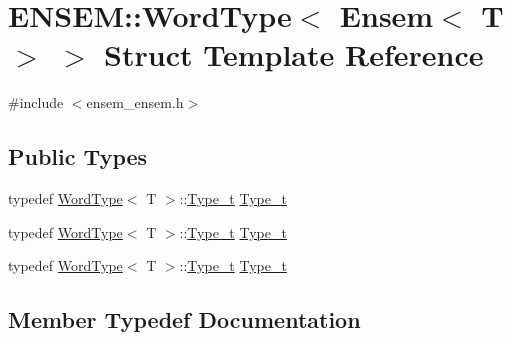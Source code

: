 \hypertarget{structENSEM_1_1WordType_3_01Ensem_3_01T_01_4_01_4}{}\section{E\+N\+S\+EM\+:\+:Word\+Type$<$ Ensem$<$ T $>$ $>$ Struct Template Reference}
\label{structENSEM_1_1WordType_3_01Ensem_3_01T_01_4_01_4}


{\ttfamily \#include $<$ensem\+\_\+ensem.\+h$>$}

\subsection*{Public Types}
\begin{DoxyCompactItemize}
\item 
typedef \mbox{\hyperlink{structENSEM_1_1WordType}{Word\+Type}}$<$ T $>$\+::\mbox{\hyperlink{structENSEM_1_1WordType_3_01Ensem_3_01T_01_4_01_4_af525fac697967b39c1ab3356734aeed7}{Type\+\_\+t}} \mbox{\hyperlink{structENSEM_1_1WordType_3_01Ensem_3_01T_01_4_01_4_af525fac697967b39c1ab3356734aeed7}{Type\+\_\+t}}
\item 
typedef \mbox{\hyperlink{structENSEM_1_1WordType}{Word\+Type}}$<$ T $>$\+::\mbox{\hyperlink{structENSEM_1_1WordType_3_01Ensem_3_01T_01_4_01_4_af525fac697967b39c1ab3356734aeed7}{Type\+\_\+t}} \mbox{\hyperlink{structENSEM_1_1WordType_3_01Ensem_3_01T_01_4_01_4_af525fac697967b39c1ab3356734aeed7}{Type\+\_\+t}}
\item 
typedef \mbox{\hyperlink{structENSEM_1_1WordType}{Word\+Type}}$<$ T $>$\+::\mbox{\hyperlink{structENSEM_1_1WordType_3_01Ensem_3_01T_01_4_01_4_af525fac697967b39c1ab3356734aeed7}{Type\+\_\+t}} \mbox{\hyperlink{structENSEM_1_1WordType_3_01Ensem_3_01T_01_4_01_4_af525fac697967b39c1ab3356734aeed7}{Type\+\_\+t}}
\end{DoxyCompactItemize}


\subsection{Member Typedef Documentation}
\mbox{\label{structENSEM_1_1WordType_3_01Ensem_3_01T_01_4_01_4_af525fac697967b39c1ab3356734aeed7}} 
